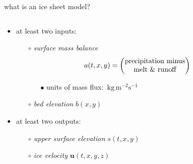 \documentclass[svgnames,
               hyperref={colorlinks,citecolor=DeepPink4,linkcolor=FireBrick,urlcolor=Maroon},
               usepdftitle=false]  %
               {beamer}
\newcommand{\bu}{\mathbf{u}}
\begin{document}
\begin{frame}{what is an ice sheet model?}

\begin{columns}
\begin{column}{0.6\textwidth}
\begin{itemize}
\begin{definition}
an \alert{ice sheet model} is a map which simulates an ice sheet in a climate
\end{definition} 
\item at least two inputs:
    \begin{itemize}
    \item[$\circ$] \emph{surface mass balance}
$$\hspace{-7mm} a(t,x,y) = \begin{pmatrix}
\text{precipitation minus} \\
\text{melt \& runoff}
\end{pmatrix}$$

\vspace{-3mm}
        \begin{itemize}
        \item[{\scriptsize $\bullet$}] units of mass flux:\, $\text{kg}\, \text{m}^{-2} \text{s}^{-1}$
        \end{itemize}

    \item[$\circ$] \emph{bed elevation} $b(x,y)$
    \end{itemize}
\item at least two outputs:
    \begin{itemize}
    \item[$\circ$] \emph{upper surface elevation} $s(t,x,y)$
    \item[$\circ$] \emph{ice velocity} $\bu(t,x,y,z)$
    \end{itemize}


\end{itemize}
\end{column}
\end{columns}
\end{frame}
\end{document}
